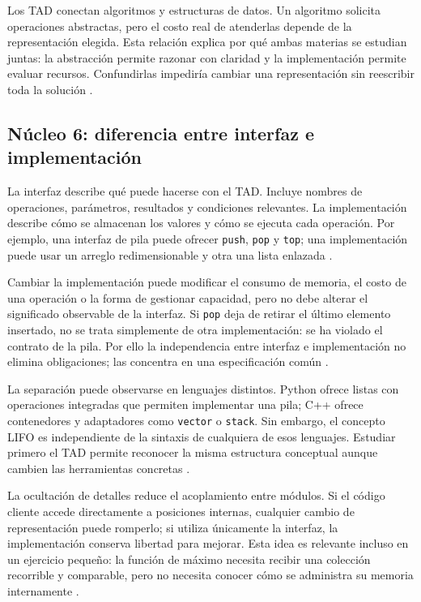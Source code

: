 \documentclass[12pt,letterpaper]{article}
\newcommand{\codigo}[1]{\texttt{#1}}
\begin{document}
Los TAD conectan algoritmos y estructuras de datos. Un algoritmo solicita operaciones abstractas, pero el costo real de atenderlas depende de la representación elegida. Esta relación explica por qué ambas materias se estudian juntas: la abstracción permite razonar con claridad y la implementación permite evaluar recursos. Confundirlas impediría cambiar una representación sin reescribir toda la solución \citep{wirth1976,aho1974,sedgewick2011}.

\subsection{Núcleo 6: diferencia entre interfaz e implementación}

La interfaz describe qué puede hacerse con el TAD. Incluye nombres de operaciones, parámetros, resultados y condiciones relevantes. La implementación describe cómo se almacenan los valores y cómo se ejecuta cada operación. Por ejemplo, una interfaz de pila puede ofrecer \codigo{push}, \codigo{pop} y \codigo{top}; una implementación puede usar un arreglo redimensionable y otra una lista enlazada \citep{liskov1974,goodrichcpp2011,sedgewick2011}.

Cambiar la implementación puede modificar el consumo de memoria, el costo de una operación o la forma de gestionar capacidad, pero no debe alterar el significado observable de la interfaz. Si \codigo{pop} deja de retirar el último elemento insertado, no se trata simplemente de otra implementación: se ha violado el contrato de la pila. Por ello la independencia entre interfaz e implementación no elimina obligaciones; las concentra en una especificación común \citep{liskov1974,goodrichpy2013,skiena2020}.

La separación puede observarse en lenguajes distintos. Python ofrece listas con operaciones integradas que permiten implementar una pila; C++ ofrece contenedores y adaptadores como \codigo{vector} o \codigo{stack}. Sin embargo, el concepto LIFO es independiente de la sintaxis de cualquiera de esos lenguajes. Estudiar primero el TAD permite reconocer la misma estructura conceptual aunque cambien las herramientas concretas \citep{python2026,goodrichcpp2011,sedgewick2011}.

La ocultación de detalles reduce el acoplamiento entre módulos. Si el código cliente accede directamente a posiciones internas, cualquier cambio de representación puede romperlo; si utiliza únicamente la interfaz, la implementación conserva libertad para mejorar. Esta idea es relevante incluso en un ejercicio pequeño: la función de máximo necesita recibir una colección recorrible y comparable, pero no necesita conocer cómo se administra su memoria internamente \citep{liskov1974,goodrichcpp2011,wirth1976}.
\end{document}
